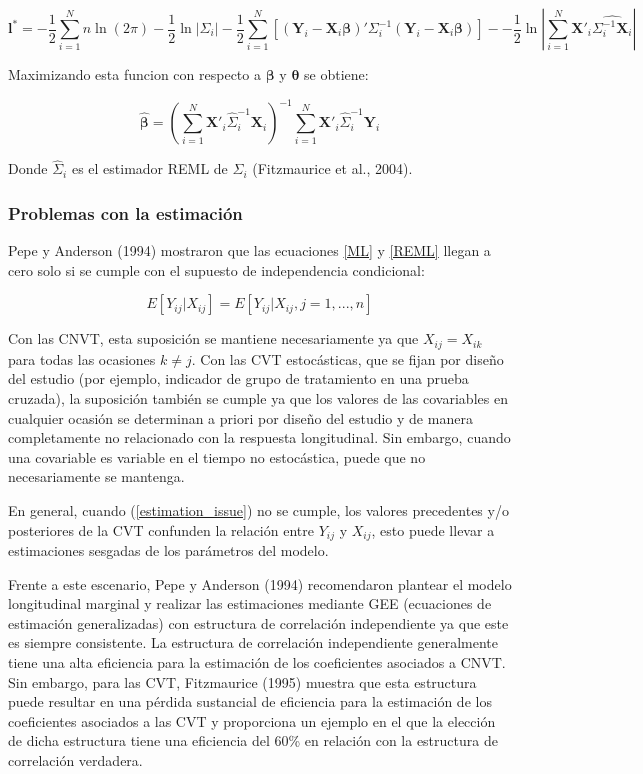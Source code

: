 \documentclass[spanish]{article}
\numberwithin{figure}{subsection}
\numberwithin{equation}{subsection}
\numberwithin{table}{subsection}
\begin{document}
\begin{equation}
\label{REML}
	\bm{l}^* = -\frac{1}{2} \sum_{i=1}^{N}n \ln(2\pi) - \frac{1}{2}\ln|\bm{\varSigma}_i| -
	\frac{1}{2} \sum_{i=1}^{N} [(\bm{Y}_i - \bm{X}_i\bm{\beta})'
	\bm{\varSigma}_i^{-1} (\bm{Y}_i - \bm{X}_i\bm{\beta})] -
	- \frac{1}{2} \ln |\sum_{i=1}^{N} \bm{X}'_i \hat{\bm{\varSigma}_i^{-1} \bm{X}_i}|
\end{equation}

Maximizando esta funcion con respecto a $\bm{\beta}$ y $\bm{\theta}$ se obtiene:

\[ \hat{\bm{\beta}} = (\sum_{i=1}^{N} \bm{X}'_i \hat{\bm{\varSigma}}_i^{-1} \bm{X}_i)^{-1}
\sum_{i=1}^{N} \bm{X}'_i \hat{\bm{\varSigma}}_i^{-1} \bm{Y}_i\]

Donde $\hat{\bm{\varSigma}}_i$ es el estimador REML de ${\bm{\varSigma}_i}$ (Fitzmaurice et al., 2004).

\subsubsection{Problemas con la estimación}

Pepe y Anderson (1994) mostraron que las ecuaciones \ref{ML} y \ref{REML} llegan
a cero solo si se cumple con el supuesto de independencia condicional:

\begin{equation}
\label{estimation_issue}
	E[Y_{ij} | X_{ij}] = E[Y_{ij} | X_{ij}, j = 1, ..., n]
\end{equation}

Con las CNVT, esta suposición se mantiene necesariamente ya que $X_{ij} =
X_{ik}$ para todas las ocasiones $k \neq j$. Con las CVT estocásticas, que se
fijan por diseño del estudio (por ejemplo, indicador de grupo de tratamiento en
una prueba cruzada), la suposición también se cumple ya que los valores de las
covariables en cualquier ocasión se determinan a priori por diseño del estudio y
de manera completamente no relacionado con la respuesta longitudinal. Sin
embargo, cuando una covariable es variable en el tiempo no estocástica, puede
que no necesariamente se mantenga.

En general, cuando (\ref{estimation_issue}) no se cumple, los valores
precedentes y/o posteriores de la CVT confunden la relación entre $Y_{ij}$ y
$X_{ij}$, esto puede llevar a estimaciones sesgadas de los parámetros del
modelo.

Frente a este escenario, Pepe y Anderson (1994) recomendaron plantear el modelo
longitudinal marginal y realizar las estimaciones mediante GEE (ecuaciones de
estimación generalizadas) con estructura de correlación independiente ya que
este es siempre consistente. La estructura de correlación independiente
generalmente tiene una alta eficiencia para la estimación de los coeficientes
asociados a CNVT. Sin embargo, para las CVT, Fitzmaurice (1995) muestra que esta
estructura puede resultar en una pérdida sustancial de eficiencia para la
estimación de los coeficientes asociados a las CVT y proporciona un ejemplo en
el que la elección de dicha estructura tiene una eficiencia del 60\% en relación
con la estructura de correlación verdadera.
\end{document}
